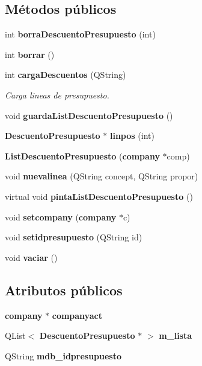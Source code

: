 \subsection*{M\'{e}todos p\'{u}blicos}
\begin{CompactItemize}
\item 
int {\bf borra\-Descuento\-Presupuesto} (int)\label{classListDescuentoPresupuesto_a0}

\item 
int {\bf borrar} ()\label{classListDescuentoPresupuesto_a1}

\item 
int {\bf carga\-Descuentos} (QString)
\begin{CompactList}\small\item\em Carga lineas de presupuesto. \item\end{CompactList}\item 
void {\bf guarda\-List\-Descuento\-Presupuesto} ()\label{classListDescuentoPresupuesto_a3}

\item 
{\bf Descuento\-Presupuesto} $\ast$ {\bf linpos} (int)\label{classListDescuentoPresupuesto_a4}

\item 
{\bf List\-Descuento\-Presupuesto} ({\bf company} $\ast$comp)\label{classListDescuentoPresupuesto_a6}

\item 
void {\bf nuevalinea} (QString concept, QString propor)\label{classListDescuentoPresupuesto_a7}

\item 
virtual void {\bf pinta\-List\-Descuento\-Presupuesto} ()\label{classListDescuentoPresupuesto_a8}

\item 
void {\bf setcompany} ({\bf company} $\ast$c)\label{classListDescuentoPresupuesto_a9}

\item 
void {\bf setidpresupuesto} (QString id)\label{classListDescuentoPresupuesto_a10}

\item 
void {\bf vaciar} ()\label{classListDescuentoPresupuesto_a11}

\end{CompactItemize}
\subsection*{Atributos p\'{u}blicos}
\begin{CompactItemize}
\item 
{\bf company} $\ast$ {\bf companyact}\label{classListDescuentoPresupuesto_o0}

\item 
QList$<$ {\bf Descuento\-Presupuesto} $\ast$ $>$ {\bf m\_\-lista}\label{classListDescuentoPresupuesto_o1}

\item 
QString {\bf mdb\_\-idpresupuesto}\label{classListDescuentoPresupuesto_o2}

\end{CompactItemize}


